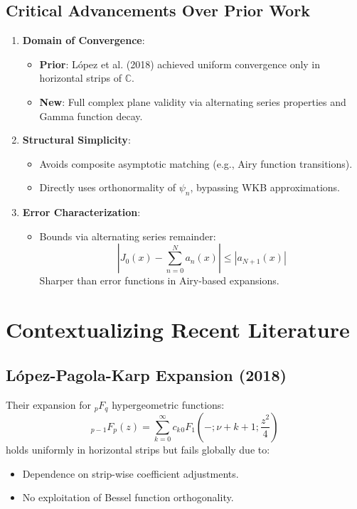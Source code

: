 \documentclass{article}
\begin{document}
\subsection*{Critical Advancements Over Prior Work}

\begin{enumerate}
    \item \textbf{Domain of Convergence}:
    \begin{itemize}
        \item \textbf{Prior}: López et al. (2018) achieved uniform convergence only in horizontal strips of $\mathbb{C}$.
        \item \textbf{New}: Full complex plane validity via alternating series properties and Gamma function decay.
    \end{itemize}
    
    \item \textbf{Structural Simplicity}:
    \begin{itemize}
        \item Avoids composite asymptotic matching (e.g., Airy function transitions).
        \item Directly uses orthonormality of $\psi_n$, bypassing WKB approximations.
    \end{itemize}
    
    \item \textbf{Error Characterization}:
    \begin{itemize}
        \item Bounds via alternating series remainder:
        $$\left| J_0(x) - \sum_{n=0}^N a_n(x) \right| \leq |a_{N+1}(x)|$$
        Sharper than error functions in Airy-based expansions.
    \end{itemize}
\end{enumerate}

\section*{Contextualizing Recent Literature}

\subsection*{López-Pagola-Karp Expansion (2018)}

Their expansion for ${}_pF_q$ hypergeometric functions:
$${}_{p-1}F_p(z) = \sum_{k=0}^\infty c_k {}_0F_1\left(-; \nu + k + 1; \frac{z^2}{4}\right)$$
holds uniformly in horizontal strips but fails globally due to:
\begin{itemize}
    \item Dependence on strip-wise coefficient adjustments.
    \item No exploitation of Bessel function orthogonality.
\end{itemize}
\end{document}
